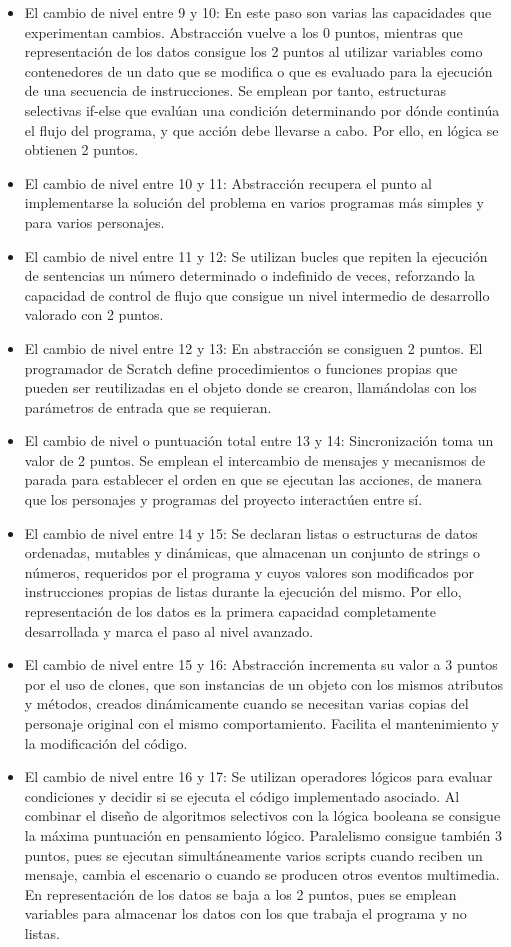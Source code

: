 \documentclass[a4paper, 12pt]{book}
\begin{document}
\begin{itemize}
 \item El cambio de nivel entre 9 y 10: En este paso son varias las capacidades que experimentan cambios. Abstracción vuelve a los 0 puntos, mientras que representación de los datos consigue los 2 puntos al utilizar variables como contenedores de un dato que se modifica o que es evaluado para la ejecución de una secuencia de instrucciones. Se emplean por tanto, estructuras selectivas if-else que evalúan una condición determinando por dónde continúa el flujo del programa, y que acción debe llevarse a cabo. Por ello, en lógica se obtienen 2 puntos.
 \item El cambio de nivel entre 10 y 11: Abstracción recupera el punto al implementarse la solución del problema en varios programas más simples y para varios personajes.
 \item El cambio de nivel entre 11 y 12: Se utilizan bucles que repiten la ejecución de sentencias un número determinado o indefinido de veces, reforzando la capacidad de control de flujo que consigue un nivel intermedio de desarrollo valorado con 2 puntos.
 \item El cambio de nivel entre 12 y 13: En abstracción se consiguen 2 puntos. El programador de Scratch define procedimientos o funciones propias que pueden ser reutilizadas en el objeto donde se crearon, llamándolas con los parámetros de entrada que se requieran. 
 \item El cambio de nivel o puntuación total entre 13 y 14: Sincronización toma un valor de 2 puntos. Se emplean el intercambio de mensajes y mecanismos de parada para establecer el orden en que se ejecutan las acciones, de manera que los personajes y programas del proyecto interactúen entre sí.
 \item El cambio de nivel entre 14 y 15: Se declaran listas o estructuras de datos ordenadas, mutables y dinámicas, que almacenan un conjunto de strings o números, requeridos por el programa y cuyos valores son modificados por instrucciones propias de listas durante la ejecución del mismo. Por ello, representación de los datos es la primera capacidad completamente desarrollada y marca el paso al nivel avanzado.
 \item El cambio de nivel entre 15 y 16: Abstracción incrementa su valor a 3 puntos por el uso de clones, que son instancias de un objeto con los mismos atributos y métodos, creados dinámicamente cuando se necesitan varias copias del personaje original con el mismo comportamiento. Facilita el mantenimiento y la modificación del código. 
 \item El cambio de nivel entre 16 y 17: Se utilizan operadores lógicos para evaluar condiciones y decidir si se ejecuta el código implementado asociado. Al combinar el diseño de algoritmos selectivos con la lógica booleana se consigue la máxima puntuación en pensamiento lógico. Paralelismo consigue también 3 puntos, pues se ejecutan simultáneamente varios scripts cuando reciben un mensaje, cambia el escenario o cuando se producen otros eventos multimedia. En representación de los datos se baja a los 2 puntos, pues se emplean variables para almacenar los datos con los que trabaja el programa y no listas.

\end{itemize}
\end{document}
